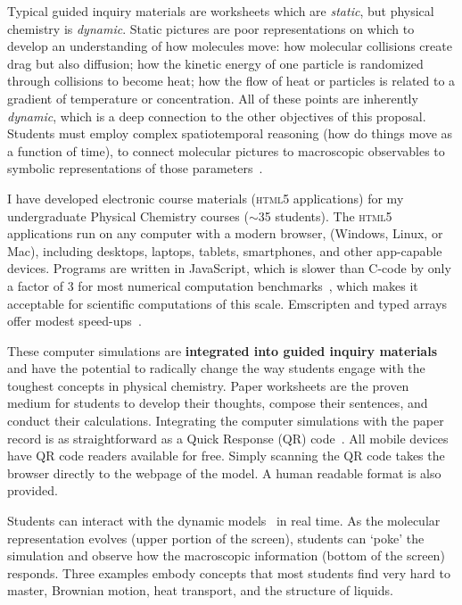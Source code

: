 \documentclass[10pt,letterpaper]{article}
\begin{document}

Typical guided inquiry materials are worksheets which are \textit{static}, but physical chemistry is \textit{dynamic}. 
Static pictures are poor representations on which to develop an understanding of how molecules move: how molecular collisions create drag but also diffusion; how the kinetic energy of one particle is randomized through collisions to become heat;
how the flow of heat or particles is related to a gradient of temperature or concentration. All of these points are inherently \textit{dynamic}, which is a deep connection to the other objectives of this proposal. Students must employ complex spatiotemporal reasoning (how do things move as a function of time), to connect molecular pictures to macroscopic observables to symbolic representations of those parameters~\cite{burkeJCE-98,marsonJCE-11}. 


I have developed electronic course materials (\textsc{html5} applications) for my undergraduate Physical Chemistry courses ($\sim$35 students). The \textsc{html5} applications run on any computer with a modern browser, (Windows, Linux, or Mac), including desktops, laptops, tablets, smartphones, and other app-capable devices. Programs are written in JavaScript, which is slower than C-code by only a factor of 3 for most numerical computation benchmarks~\cite{Khan2014}, which makes it acceptable for scientific computations of this scale. Emscripten and typed arrays offer modest speed-ups~\cite{Khan2014}. 

These computer simulations are \textbf{integrated into guided inquiry materials} and have the potential to radically change the way students engage with the toughest concepts in physical chemistry. Paper worksheets are the proven medium for students to develop their thoughts, compose their sentences, and conduct their calculations. Integrating the computer simulations with the paper record is as straightforward as a Quick Response (QR) code~. All mobile devices have QR code readers available for free. Simply scanning the QR code takes the browser directly to the webpage of the model. A human readable format is also provided.

Students can interact with the dynamic models~ in real time. As the molecular representation evolves (upper portion of the screen), students can `poke' the simulation and observe how the macroscopic information (bottom of the screen) responds. Three examples  embody concepts that most students find very hard to master, Brownian motion, heat transport, and the structure of liquids.
\end{document}
